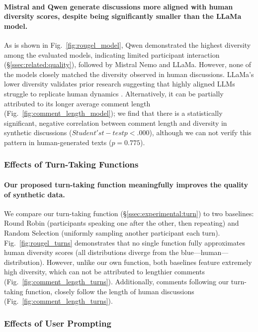 \paragraph{Mistral and Qwen generate discussions more aligned with human diversity scores, despite being significantly smaller than the LLaMa model.} As is shown in Fig.~\ref{fig:rougel_model}, Qwen demonstrated the highest diversity among the evaluated models, indicating limited participant interaction (\S\ref{ssec:related:quality}), followed by Mistral Nemo and LLaMa. However, none of the models closely matched the diversity observed in human discussions. 
LLaMa's lower diversity validates prior research suggesting that highly aligned \acp{LLM} struggle to replicate human dynamics \cite{Park2023GenerativeAI, leng_2024}. Alternatively, it can be partially attributed to its longer average comment length (Fig.~\ref{fig:comment_length_model}); we find that there is a statistically significant, negative correlation between comment length and diversity in synthetic discussions ($Student's t-test p < .000$), although we can not verify this pattern in human-generated texts ($p = 0.775$).


\subsubsection{Effects of Turn-Taking Functions}

\paragraph{Our proposed turn-taking function meaningfully improves the quality of synthetic data.} We compare our turn-taking function (\S\ref{ssec:experimental:turn}) to two baselines: Round Robin (participants speaking one after the other, then repeating) and Random Selection (uniformly sampling another participant each turn). Fig.~\ref{fig:rougel_turns} demonstrates that no single function fully approximates human diversity scores (all distributions diverge from the blue—human—distribution). However, unlike our own function, both baselines feature extremely high diversity, which can not be attributed to lengthier comments (Fig.~\ref{fig:comment_length_turns}). Additionally, comments following our turn-taking function, closely follow the length of human discussions (Fig.~\ref{fig:comment_length_turns}).


\subsubsection{Effects of User Prompting}

